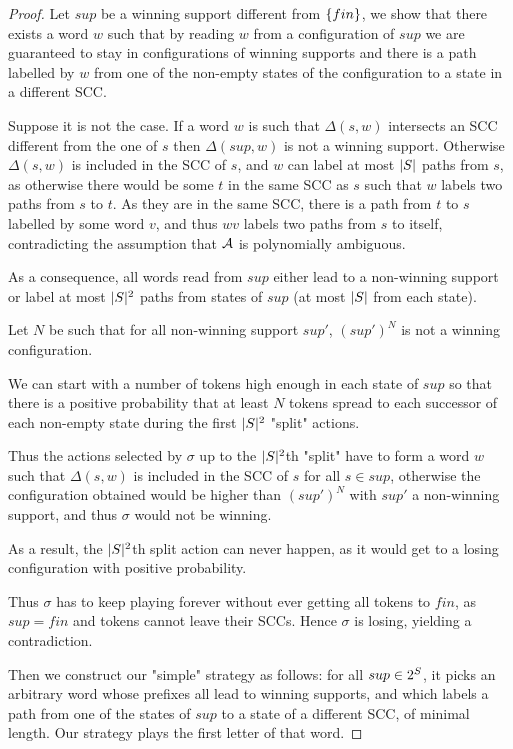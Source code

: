 \documentclass{article}
\begin{document}
\begin{proof}
	Let $sup$ be a winning support different from $\{ fin \}$, we show that there exists a word $w$ such that by reading $w$ from a configuration of $sup$ we are guaranteed to stay in configurations of winning supports and there is a path labelled by $w$ from one of the non-empty states of the configuration to a state in a different SCC.
	
	Suppose it is not the case.
	If a word $w$ is such that $\Delta(s, w)$ intersects an SCC different from the one of $s$ then $\Delta(sup, w)$ is not a winning support. Otherwise $\Delta(s, w)$ is included in the SCC of $s$, and $w$ can label at most $|S|$ paths from $s$, as otherwise there would be some $t$ in the same SCC as $s$ such that $w$ labels two paths from $s$ to $t$. As they are in the same SCC, there is a path from $t$ to $s$ labelled by some word $v$, and thus $wv$ labels two paths from $s$ to itself, contradicting the assumption that $\mathcal{A}$ is polynomially ambiguous.
	
	As a consequence, all words read from $sup$ either lead to a non-winning support or label at most $|S|^2$ paths from states of $sup$ (at most $|S|$ from each state).
	
	Let $N$ be such that for all non-winning support $sup'$, $(sup')^N$ is not a winning configuration.
	
	We can start with a number of tokens high enough in each state of $sup$ so that there is a positive probability that at least $N$ tokens spread to each successor of each non-empty state during the first $|S|^2$ "split" actions.
	
	Thus the actions selected by $\sigma$ up to the $|S|^2$th "split" have to form a word $w$ such that $\Delta(s, w)$ is included in the SCC of $s$ for all $s \in sup$, otherwise the configuration obtained would be higher than $(sup')^N$ with $sup'$ a non-winning support, and thus $\sigma$ would not be winning.
	
	As a result, the $|S|^2$th split action can never happen, as it would get to a losing configuration with positive probability.
	
	Thus $\sigma$ has to keep playing forever without ever getting all tokens to $fin$, as $sup = fin$ and tokens cannot leave their SCCs. Hence $\sigma$ is losing, yielding a contradiction.

	Then we construct our "simple" strategy as follows: for all $sup \in 2^{S}$, it picks an arbitrary word whose prefixes all lead to winning supports, and which labels a path from one of the states of $sup$ to a state of a different SCC, of minimal length. Our strategy plays the first letter of that word.
	

\end{proof}
\end{document}
